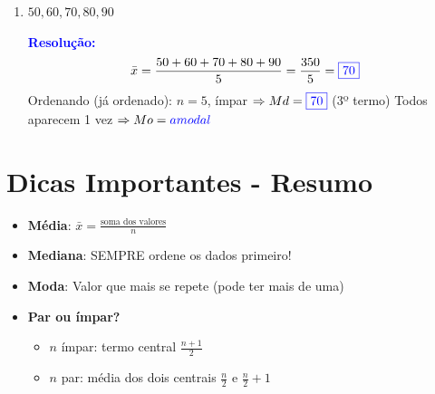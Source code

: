 \documentclass[11pt]{article}
\newcommand{\respostaNum}[1]{\textcolor{blue}{\boxed{#1}}}
\newcommand{\respostaTxt}[1]{\textcolor{blue}{#1}}
\newcommand{\resolucao}{\textbf{\textcolor{blue}{Resolução:}}}
\begin{document}
\begin{multicols}{2}
\begin{enumerate}[leftmargin=*]
\begin{enumerate}[label=\alph*)]
\resolucao
\[
\bar{x} = \frac{3+4+4+5+6+6+6+7+8}{9} = \frac{49}{9} \approx \respostaNum{5,44}
\]
Ordenando (já ordenado): $n = 9$, ímpar $\Rightarrow Md = \respostaNum{6}$ (5º termo)
O valor 6 aparece 3 vezes $\Rightarrow Mo = \respostaNum{6}$

\item $50, 60, 70, 80, 90$

\resolucao
\[
\bar{x} = \frac{50+60+70+80+90}{5} = \frac{350}{5} = \respostaNum{70}
\]
Ordenando (já ordenado): $n = 5$, ímpar $\Rightarrow Md = \respostaNum{70}$ (3º termo)
Todos aparecem 1 vez $\Rightarrow Mo = \respostaTxt{amodal}$
\end{enumerate}
\end{enumerate}

\section*{Dicas Importantes - Resumo}

\begin{itemize}
\item \textbf{Média}: $\displaystyle \bar{x} = \frac{\text{soma dos valores}}{n}$
\item \textbf{Mediana}: SEMPRE ordene os dados primeiro!
\item \textbf{Moda}: Valor que mais se repete (pode ter mais de uma)
\item \textbf{Par ou ímpar?} 
  \begin{itemize}
    \item $n$ ímpar: termo central $\frac{n+1}{2}$
    \item $n$ par: média dos dois centrais $\frac{n}{2}$ e $\frac{n}{2}+1$
  \end{itemize}
\end{itemize}

\begin{center}

\vspace{0.3cm}



\end{center}
\end{multicols}
\end{document}
